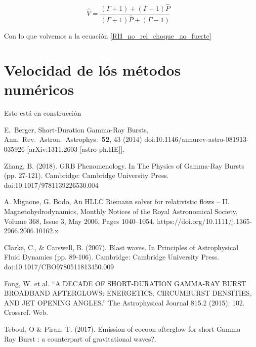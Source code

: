 \documentclass[12pt,a4paper]{book}
\begin{document}
\begin{equation}
\hat { V } = \frac { ( \Gamma + 1 ) + ( \Gamma - 1 ) \hat { P } } { ( \Gamma + 1 ) \hat { P } + ( \Gamma - 1 ) }
\end{equation}

Con lo que volvemos a la ecuación \ref{RH_no_rel_choque_no_fuerte}

\chapter{Velocidad de lós métodos numéricos} \label{aped.D}

Esto está en construcción

\begin{thebibliography}{20}


  E.~Berger,
  Short-Duration Gamma-Ray Bursts,
  Ann.\ Rev.\ Astron.\ Astrophys.\  {\bf 52}, 43 (2014)
  doi:10.1146/annurev-astro-081913-035926
  [arXiv:1311.2603 [astro-ph.HE]].
 


Zhang, B. (2018). GRB Phenomenology. In The Physics of Gamma-Ray Bursts (pp. 27-121). Cambridge: Cambridge University Press. doi:10.1017/9781139226530.004

A. Mignone, G. Bodo, An HLLC Riemann solver for relativistic flows – II. Magnetohydrodynamics, Monthly Notices of the Royal Astronomical Society, Volume 368, Issue 3, May 2006, Pages 1040–1054, https://doi.org/10.1111/j.1365-2966.2006.10162.x

Clarke, C., \& Carswell, B. (2007). Blast waves. In Principles of Astrophysical Fluid Dynamics (pp. 89-106). Cambridge: Cambridge University Press. doi:10.1017/CBO9780511813450.009

Fong, W. et al. “A DECADE OF SHORT-DURATION GAMMA-RAY BURST BROADBAND AFTERGLOWS: ENERGETICS, CIRCUMBURST DENSITIES, AND JET OPENING ANGLES.” The Astrophysical Journal 815.2 (2015): 102. Crossref. Web.

Teboul, O \& Piran, T. (2017). Emission of cocoon afterglow for short Gamma Ray Burst : a counterpart of gravitational waves?. 


\end{thebibliography}
\end{document}
